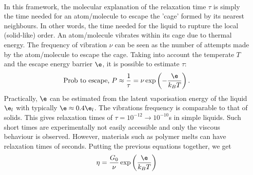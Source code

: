 \documentclass[a4paper, 11pt, normalem]{report}
\begin{document}
\begin{figure}[H]
\\
    \vspace{20pt}
\end{figure}
In this framework, the molecular explanation of the relaxation time $\tau$ is simply the time needed for an atom/molecule to escape the 'cage' formed by its nearest neighbours.
In other words, the time needed for the liquid to rupture the local (solid-like) order.
An atom/molecule vibrates within its cage due to thermal energy.
The frequency of vibration $\nu$ can be seen as the number of attempts made by the atom/molecule to escape the cage.
Taking into account the temperate $T$ and the escape energy barrier $\e$, it is possible to estimate $\tau$:
\begin{equation}
    \text{Prob to escape, } P \approx \frac{1}{\tau} = \nu \exp\left(-\frac{\e}{k_BT}\right).
\end{equation}
Practically, $\e$ can be estimated from the latent vaporisation energy of the liquid $\e_l$ with typically $\e \approx 0.4\e_l$.
The vibrations frequency is comparable to that of solids.
This gives relaxation times of $\tau = 10^{-12} \to 10^{-10}$s in simple liquids.
Such short times are experimentally not easily accessible and only the viscous behaviour is observed.
However, materials such as polymer melts can have relaxation times of seconds.
Putting the previous equations together, we get
\begin{equation}
    \eta = \frac{G_0}{\nu}\exp\left(\frac{\e}{k_BT}\right)
\end{equation}
\end{document}

